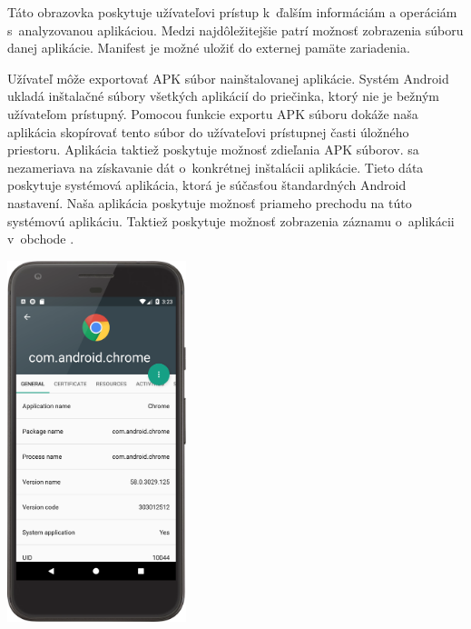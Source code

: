 Táto obrazovka poskytuje užívateľovi prístup k~ďalším informáciám a operáciám s~analyzovanou aplikáciou. Medzi najdôležitejšie patrí možnosť zobrazenia súboru  danej aplikácie. Manifest je možné uložiť do externej pamäte zariadenia.

\begin{minipage}[H]{\textwidth}
\begin{minipage}[t]{0.48\textwidth}
Užívateľ môže exportovať APK súbor nainštalovanej aplikácie. Systém Android ukladá inštalačné súbory všetkých aplikácií do priečinka, ktorý nie je bežným užívateľom prístupný. Pomocou funkcie exportu APK súboru dokáže naša aplikácia skopírovať tento súbor do užívateľovi prístupnej časti úložného priestoru. Aplikácia taktiež poskytuje možnosť zdieľania APK súborov. 
 sa nezameriava na získavanie dát o~konkrétnej inštalácii aplikácie. Tieto dáta poskytuje systémová aplikácia, ktorá je súčasťou štandardných Android nastavení. Naša aplikácia poskytuje možnosť priameho prechodu na túto systémovú aplikáciu.  Taktiež poskytuje možnosť zobrazenia záznamu o~aplikácii v~obchode .
\end{minipage}%
\hfill
\centering
\begin{minipage}[t][][b]{0.45\textwidth}
\centering
\includegraphics[width=5.2cm]{images/app/detail_device.png}
\centering
{}
\label{fig:app-detail}
\end{minipage}%
\end{minipage}

